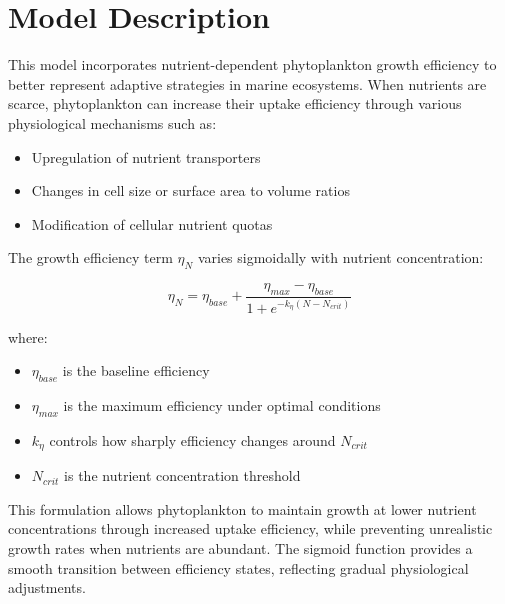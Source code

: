 \section{Model Description}

This model incorporates nutrient-dependent phytoplankton growth efficiency to better represent adaptive strategies in marine ecosystems. When nutrients are scarce, phytoplankton can increase their uptake efficiency through various physiological mechanisms such as:

\begin{itemize}
\item Upregulation of nutrient transporters
\item Changes in cell size or surface area to volume ratios
\item Modification of cellular nutrient quotas
\end{itemize}

The growth efficiency term $\eta_N$ varies sigmoidally with nutrient concentration:

\[ \eta_N = \eta_{base} + \frac{\eta_{max} - \eta_{base}}{1 + e^{-k_{\eta}(N - N_{crit})}} \]

where:
\begin{itemize}
\item $\eta_{base}$ is the baseline efficiency
\item $\eta_{max}$ is the maximum efficiency under optimal conditions
\item $k_{\eta}$ controls how sharply efficiency changes around $N_{crit}$
\item $N_{crit}$ is the nutrient concentration threshold
\end{itemize}

This formulation allows phytoplankton to maintain growth at lower nutrient concentrations through increased uptake efficiency, while preventing unrealistic growth rates when nutrients are abundant. The sigmoid function provides a smooth transition between efficiency states, reflecting gradual physiological adjustments.
